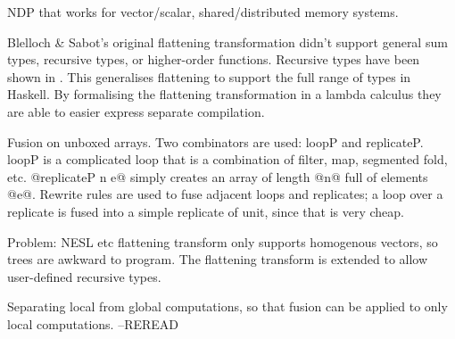 NDP that works for vector/scalar, shared/distributed memory systems.

Blelloch \& Sabot's original flattening transformation didn't support general sum types, recursive types, or higher-order functions. Recursive types have been shown in \cite{keller1998flattening}.
This generalises flattening to support the full range of types in Haskell.
By formalising the flattening transformation in a lambda calculus they are able to easier express separate compilation.

Fusion on unboxed arrays. Two combinators are used: loopP and replicateP.
loopP is a complicated loop that is a combination of filter, map, segmented fold, etc.
@replicateP n e@ simply creates an array of length @n@ full of elements @e@.
Rewrite rules are used to fuse adjacent loops and replicates; a loop over a replicate is
fused into a simple replicate of unit, since that is very cheap.




Problem: NESL etc flattening transform only supports homogenous vectors, so trees are awkward to program.
The flattening transform is extended to allow user-defined recursive types.

Separating local from global computations, so that fusion can be applied to only local computations.
--REREAD





